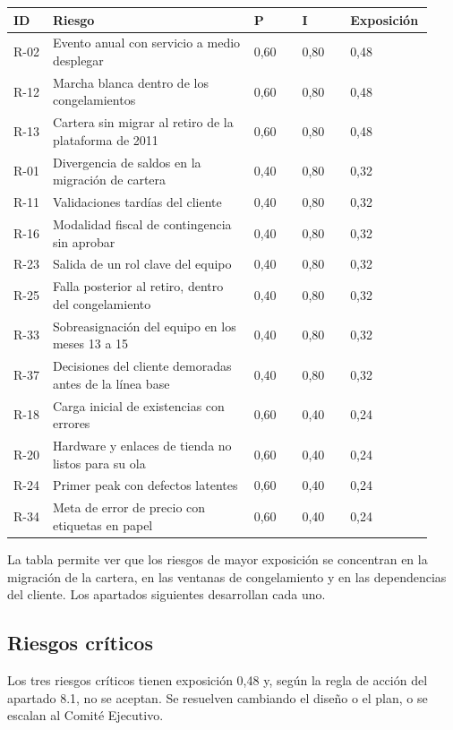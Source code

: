 \documentclass[11pt]{article}
\begin{document}
\begin{longtable}{p{0.097\linewidth}p{0.465\linewidth}p{0.116\linewidth}p{0.116\linewidth}p{0.136\linewidth}}
\toprule
\textbf{ID} & \textbf{Riesgo} & \textbf{P} & \textbf{I} & \textbf{Exposición} \\
\midrule
\endhead
\bottomrule
\endlastfoot
R-02 & Evento anual con servicio a medio desplegar & 0,60 & 0,80 & 0,48 \\
R-12 & Marcha blanca dentro de los congelamientos & 0,60 & 0,80 & 0,48 \\
R-13 & Cartera sin migrar al retiro de la plataforma de 2011 & 0,60 & 0,80 & 0,48 \\
R-01 & Divergencia de saldos en la migración de cartera & 0,40 & 0,80 & 0,32 \\
R-11 & Validaciones tardías del cliente & 0,40 & 0,80 & 0,32 \\
R-16 & Modalidad fiscal de contingencia sin aprobar & 0,40 & 0,80 & 0,32 \\
R-23 & Salida de un rol clave del equipo & 0,40 & 0,80 & 0,32 \\
R-25 & Falla posterior al retiro, dentro del congelamiento & 0,40 & 0,80 & 0,32 \\
R-33 & Sobreasignación del equipo en los meses 13 a 15 & 0,40 & 0,80 & 0,32 \\
R-37 & Decisiones del cliente demoradas antes de la línea base & 0,40 & 0,80 & 0,32 \\
R-18 & Carga inicial de existencias con errores & 0,60 & 0,40 & 0,24 \\
R-20 & Hardware y enlaces de tienda no listos para su ola & 0,60 & 0,40 & 0,24 \\
R-24 & Primer peak con defectos latentes & 0,60 & 0,40 & 0,24 \\
R-34 & Meta de error de precio con etiquetas en papel & 0,60 & 0,40 & 0,24 \\
\end{longtable}

La tabla permite ver que los riesgos de mayor exposición se concentran en la migración de la cartera, en las ventanas de congelamiento y en las dependencias del cliente. Los apartados siguientes desarrollan cada uno.

\subsection{Riesgos críticos}

Los tres riesgos críticos tienen exposición 0,48 y, según la regla de acción del apartado 8.1, no se aceptan. Se resuelven cambiando el diseño o el plan, o se escalan al Comité Ejecutivo.
\end{document}
